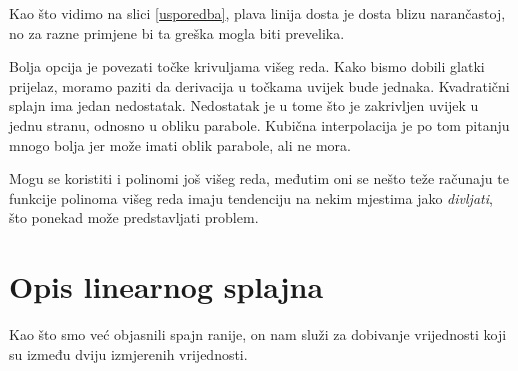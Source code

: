 \documentclass[12pt,a4paper]{report}
\begin{document}
	Kao što vidimo na slici \ref{usporedba}, plava linija dosta je dosta blizu narančastoj, no za razne primjene bi ta greška mogla biti prevelika.
	
	Bolja opcija je povezati točke krivuljama višeg reda. Kako bismo dobili glatki prijelaz, moramo paziti da derivacija u točkama uvijek bude jednaka. Kvadratični splajn ima jedan nedostatak. Nedostatak je u tome što je zakrivljen uvijek u jednu stranu, odnosno u obliku parabole. Kubična interpolacija je po tom pitanju mnogo bolja jer može imati oblik parabole, ali ne mora. 
	
	Mogu se koristiti i polinomi još višeg reda, međutim oni se nešto teže računaju te funkcije polinoma višeg reda imaju tendenciju na nekim mjestima jako \textit{divljati}, što ponekad može predstavljati problem.
	\section{Opis linearnog splajna}
	
	Kao što smo već objasnili spajn ranije, on nam služi za dobivanje vrijednosti koji su između dviju izmjerenih vrijednosti.
	
\end{document}
